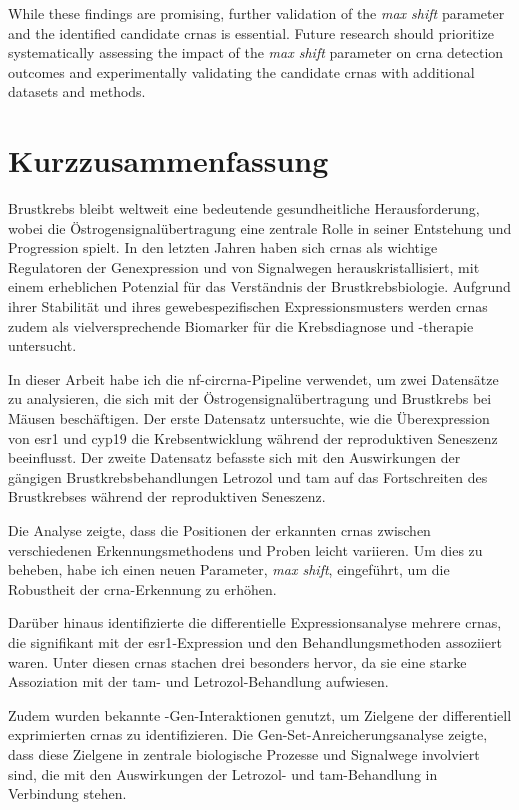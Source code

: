 While these findings are promising, further validation of the \textit{max
    shift} parameter and the identified candidate \glspl{crna} is essential.
Future research should prioritize systematically assessing the impact of the
\textit{max shift} parameter on \gls{crna} detection outcomes and
experimentally validating the candidate \glspl{crna} with additional datasets
and methods.

\newpage

\section{Kurzzusammenfassung}

Brustkrebs bleibt weltweit eine bedeutende gesundheitliche Herausforderung,
wobei die Östrogensignalübertragung eine zentrale Rolle in seiner Entstehung
und Progression spielt.
In den letzten Jahren haben sich \glspl{crna} als wichtige Regulatoren der
Genexpression und von Signalwegen herauskristallisiert, mit einem erheblichen
Potenzial für das Verständnis der Brustkrebsbiologie.
Aufgrund ihrer Stabilität und ihres gewebespezifischen Expressionsmusters
werden \glspl{crna} zudem als vielversprechende Biomarker für die Krebsdiagnose
und -therapie untersucht.

In dieser Arbeit habe ich die \gls{nf-circrna}-Pipeline verwendet, um zwei
Datensätze zu analysieren, die sich mit der Östrogensignalübertragung und
Brustkrebs bei Mäusen beschäftigen.
Der erste Datensatz untersuchte, wie die Überexpression von \gls{esr1} und
\gls{cyp19} die Krebsentwicklung während der reproduktiven Seneszenz
beeinflusst.
Der zweite Datensatz befasste sich mit den Auswirkungen der gängigen
Brustkrebsbehandlungen Letrozol und \Gls{tam} auf das Fortschreiten des
Brustkrebses während der reproduktiven Seneszenz.

Die Analyse zeigte, dass die Positionen der erkannten \glspl{crna} zwischen
verschiedenen Erkennungsmethodens und Proben leicht variieren.
Um dies zu beheben, habe ich einen neuen Parameter, \textit{max shift},
eingeführt, um die Robustheit der \gls{crna}-Erkennung zu erhöhen.

Darüber hinaus identifizierte die differentielle Expressionsanalyse mehrere
\glspl{crna}, die signifikant mit der \gls{esr1}-Expression und den
Behandlungsmethoden assoziiert waren.
Unter diesen \glspl{crna} stachen drei besonders hervor, da sie eine starke
Assoziation mit der \Gls{tam}- und Letrozol-Behandlung aufwiesen.

Zudem wurden bekannte -Gen-Interaktionen genutzt, um Zielgene
der differentiell exprimierten \glspl{crna} zu identifizieren.
Die Gen-Set-Anreicherungsanalyse zeigte, dass diese Zielgene in zentrale
biologische Prozesse und Signalwege involviert sind, die mit den Auswirkungen
der Letrozol- und \Gls{tam}-Behandlung in Verbindung stehen.

